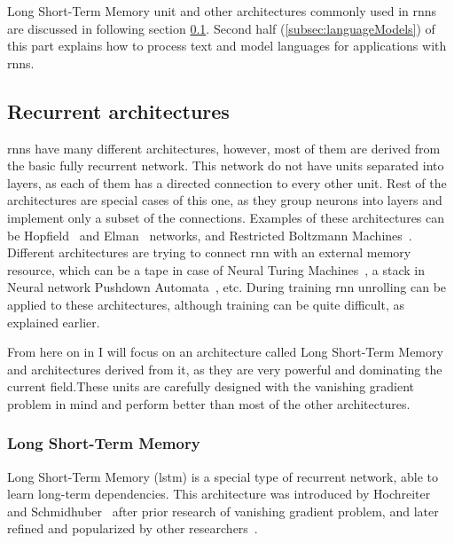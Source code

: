 Long Short-Term Memory unit and other architectures commonly used in \gls{rnn}s are discussed in following section \ref{subsec:recUnits}. Second half (\ref{subsec:languageModels}) of this part explains how to process text and model languages for applications with \gls{rnn}s.

\subsection{Recurrent architectures}\label{subsec:recUnits}

\gls{rnn}s have many different architectures, however, most of them are derived from the basic fully recurrent network. This network do not have units separated into layers, as each of them has a directed connection to every other unit. Rest of the architectures are special cases of this one, as they group neurons into layers and implement only a subset of the connections. Examples of these architectures can be Hopfield~\cite{hopfield1982neural} and Elman~\cite{elman1990finding} networks, and Restricted Boltzmann Machines~\cite{Smolensky:1986:IPD:104279.104290}. Different architectures are trying to connect \gls{rnn} with an external memory resource, which can be a tape in case of Neural Turing Machines~\cite{DBLP:journals/corr/GravesWD14}, a stack in Neural network Pushdown Automata~\cite{Sun:1997:NNP:647638.733213}, etc. During training \gls{rnn} unrolling can be applied to these architectures, although training can be quite difficult, as explained earlier.

From here on in I will focus on an architecture called Long Short-Term Memory and architectures derived from it, as they are very powerful and dominating the current field.These units are carefully designed with the vanishing gradient problem in mind and perform better than most of the other architectures.

\subsubsection{Long Short-Term Memory}\label{subsubsec:lstm}

Long Short-Term Memory (\gls{lstm}) is a special type of recurrent network, able to learn long-term dependencies. This architecture was introduced by Hochreiter and Schmidhuber~\cite{Hochreiter:1997:LSM:1246443.1246450} after prior research of vanishing gradient problem, and later refined and popularized by other researchers~\cite{DBLP:conf/ijcnn/GersS00,DBLP:journals/neco/GersSC00}.

